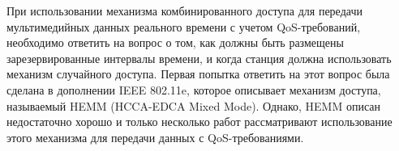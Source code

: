 

При использовании механизма комбинированного доступа для передачи мультимедийных данных реального времени с учетом QoS-требований, необходимо ответить на вопрос о том, как должны быть размещены зарезервированные интервалы времени, и когда станция должна использовать механизм случайного доступа. Первая попытка ответить на этот вопрос была сделана в дополнении  IEEE 802.11e, которое описывает механизм доступа, называемый HEMM (HCCA-EDCA Mixed Mode). Однако, HEMM описан недостаточно хорошо и только несколько работ  \cite{kuan2007utilization, lai2009adaptation, Ng2012, ruscelli2012enhancement} рассматривают использование этого механизма для передачи данных с QoS-требованиями.


